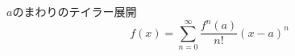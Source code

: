 \documentclass{jarticle}
\begin{document}
$a$のまわりのテイラー展開
\begin{equation}
f(x) = \sum_{n = 0}^{\infty}  \frac{f^{n} (a)}{n!} (x - a)^n
\end{equation}
\end{document}
